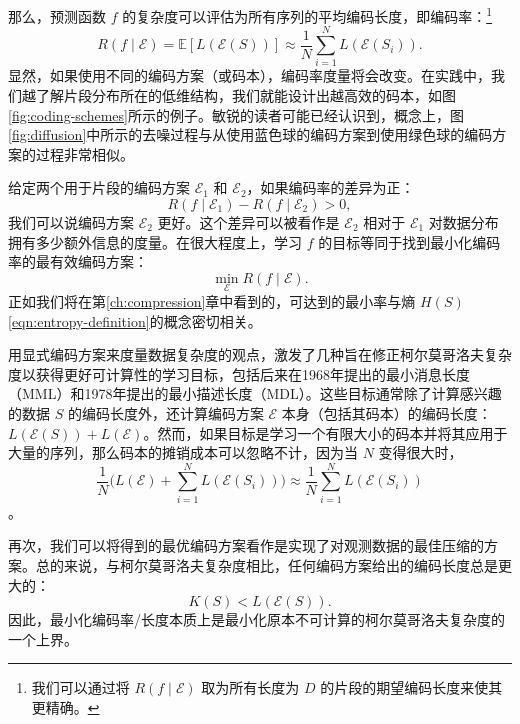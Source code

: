 \documentclass[../../book-main.tex]{subfiles}
\begin{document}
那么，预测函数 $f$ 的复杂度可以评估为所有序列的平均编码长度，即编码率：\footnote{我们可以通过将 $R(f\mid \mathcal{E})$ 取为所有长度为 $D$ 的片段的期望编码长度来使其更精确。}
\begin{equation}
   R(f \mid \mathcal E) = \mathbb{E}[L(\mathcal{E}(S))] \approx \frac{1}{N}\sum_{i=1}^N L(\mathcal{E}(S_i)). 
   \label{eqn:coding-rate}
\end{equation}
显然，如果使用不同的编码方案（或码本），编码率度量将会改变。在实践中，我们越了解片段分布所在的低维结构，我们就能设计出越高效的码本，如图\ref{fig:coding-schemes}所示的例子。敏锐的读者可能已经认识到，概念上，图\ref{fig:diffusion}中所示的去噪过程与从使用蓝色球的编码方案到使用绿色球的编码方案的过程非常相似。


给定两个用于片段的编码方案 $\mathcal{E}_1$ 和 $\mathcal{E}_2$，如果编码率的差异为正：
\begin{equation}
   R(f \mid \mathcal E_1) -  R(f \mid \mathcal E_2) > 0, 
\end{equation}
我们可以说编码方案 $\mathcal{E}_2$ 更好。这个差异可以被看作是 $\mathcal{E}_2$ 相对于 $\mathcal{E}_1$ 对数据分布拥有多少额外信息的度量。在很大程度上，学习 $f$ 的目标等同于找到最小化编码率的最有效编码方案：
\begin{equation}
   \min_{\mathcal{E}} R(f \mid \mathcal E). 
\end{equation}
正如我们将在第\ref{ch:compression}章中看到的，可达到的最小率与熵 $H(S)$ \eqref{eqn:entropy-definition}的概念密切相关。


\begin{remark}\label{rem:computable-complexity}
    {用显式编码方案来度量数据复杂度的观点，激发了几种旨在修正柯尔莫哥洛夫复杂度以获得更好可计算性的学习目标\cite{WallaceC1999}，包括后来在1968年提出的最小消息长度（MML）\cite{WallaceC1968}和1978年提出的最小描述长度（MDL）\cite{Rissanen-1978,HansenM2001}。这些目标通常除了计算感兴趣的数据 $S$ 的编码长度外，还计算编码方案 $\mathcal{E}$ 本身（包括其码本）的编码长度：$L(\mathcal E(S)) + L(\mathcal E)$。然而，如果目标是学习一个有限大小的码本并将其应用于大量的序列，那么码本的摊销成本可以忽略不计，因为当 $N$ 变得很大时，$$\frac{1}{N}\Big( L(\mathcal{E}) + \sum_{i=1}^N L(\mathcal{E}(S_i))\Big) \approx \frac{1}{N}\sum_{i=1}^N L(\mathcal{E}(S_i))$$。}
\end{remark}

再次，我们可以将得到的最优编码方案看作是实现了对观测数据的最佳压缩的方案。总的来说，与柯尔莫哥洛夫复杂度相比，任何编码方案给出的编码长度总是更大的：
\begin{equation}
    K(S) < L( \mathcal E(S)).
\end{equation} 
因此，最小化编码率/长度本质上是最小化原本不可计算的柯尔莫哥洛夫复杂度的一个上界。
\end{document}
